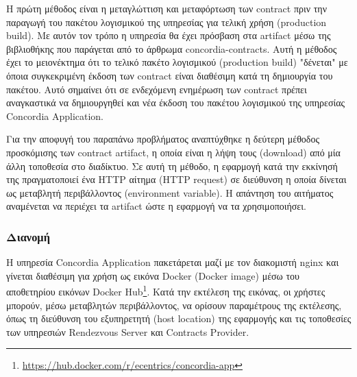 Η πρώτη μέθοδος είναι η μεταγλώττιση και μεταφόρτωση των contract πριν την παραγωγή του πακέτου λογισμικού της υπηρεσίας για τελική χρήση (production build). Με αυτόν τον τρόπο η υπηρεσία θα έχει πρόσβαση στα artifact μέσω της βιβλιοθήκης που παράγεται από το άρθρωμα concordia-contracts. Αυτή η μέθοδος έχει το μειονέκτημα ότι το τελικό πακέτο λογισμικού (production build) "δένεται" με όποια συγκεκριμένη έκδοση των contract είναι διαθέσιμη κατά τη δημιουργία του πακέτου. Αυτό σημαίνει ότι σε ενδεχόμενη ενημέρωση των contract πρέπει αναγκαστικά να δημιουργηθεί και νέα έκδοση του πακέτου λογισμικού της υπηρεσίας Concordia Application.

Για την αποφυγή του παραπάνω προβλήματος αναπτύχθηκε η δεύτερη μέθοδος προσκόμισης των contract artifact, η οποία είναι η λήψη τους (download) από μία άλλη τοποθεσία στο διαδίκτυο. Σε αυτή τη μέθοδο, η εφαρμογή κατά την εκκίνησή της πραγματοποιεί ένα HTTP αίτημα (HTTP request) σε διεύθυνση η οποία δίνεται ως μεταβλητή περιβάλλοντος (environment variable). Η απάντηση του αιτήματος αναμένεται να περιέχει τα artifact ώστε η εφαρμογή να τα χρησιμοποιήσει.

\subsubsection{Διανομή}

Η υπηρεσία Concordia Application πακετάρεται μαζί με τον διακομιστή nginx και γίνεται διαθέσιμη για χρήση ως εικόνα Docker (Docker image) μέσω του αποθετηρίου εικόνων Docker Hub\footnote{\url{https://hub.docker.com/r/ecentrics/concordia-app}}. Κατά την εκτέλεση της εικόνας, οι χρήστες μπορούν, μέσω μεταβλητών περιβάλλοντος, να ορίσουν παραμέτρους της εκτέλεσης, όπως τη διεύθυνση του εξυπηρετητή (host location) της εφαρμογής και τις τοποθεσίες των υπηρεσιών Rendezvous Server και Contracts Provider.